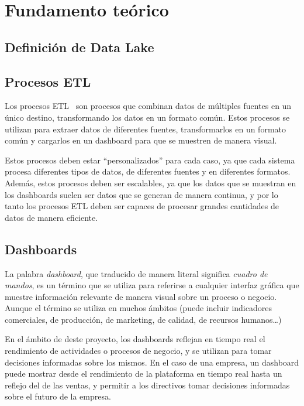 \chapter{Fundamento teórico}\label{chap:teoria}
\section{Definición de Data Lake}\label{sec:datalake}

\section{Procesos ETL}\label{sec:etl}
Los procesos ETL~\cite{mier2023dashboards} son procesos que combinan datos de múltiples
fuentes en un único destino, transformando los datos en un formato común. Estos procesos
se utilizan para extraer datos de diferentes fuentes, transformarlos en un formato común
y cargarlos en un dashboard para que se muestren de manera visual.

Estos procesos deben estar “personalizados” para cada caso, ya que cada sistema
procesa diferentes tipos de datos, de diferentes fuentes y en diferentes formatos. Además,
estos procesos deben ser escalables, ya que los datos que se muestran en los dashboards
suelen ser datos que se generan de manera continua, y por lo tanto los procesos ETL deben
ser capaces de procesar grandes cantidades de datos de manera eficiente.

\section{Dashboards}\label{sec:dashboards}
La palabra \textit{dashboard}, que traducido de manera literal significa \textit{cuadro de mandos},
es un término que se utiliza para referirse a cualquier interfaz gráfica que muestre información
relevante de manera visual sobre un proceso o negocio. Aunque el término se utiliza en
muchos ámbitos (puede incluir indicadores comerciales, de producción, de marketing, de
calidad, de recursos humanos\ldots)

En el ámbito de deste proyecto, los dashboards reflejan en tiempo real el rendimiento de
actividades o procesos de negocio, y se utilizan para tomar decisiones informadas sobre los
mismos. En el caso de una empresa, un dashboard puede mostrar desde el rendimiento de la
plataforma en tiempo real hasta un reflejo del de las ventas, y permitir a los directivos tomar decisiones informadas sobre el futuro de la empresa.


